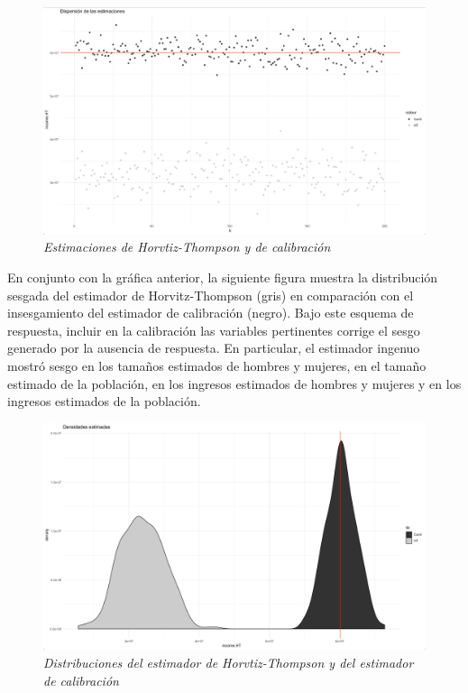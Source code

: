 \documentclass[
  10pt,
  spanish,
]{book}
\begin{document}
\begin{figure}
\centering
\includegraphics{Pics/c9.png}
\caption{\emph{Estimaciones de Horvtiz-Thompson y de calibración}}
\end{figure}

En conjunto con la gráfica anterior, la siguiente figura muestra la distribución sesgada del estimador de Horvitz-Thompson (gris) en comparación con el insesgamiento del estimador de calibración (negro). Bajo este esquema de respuesta, incluir en la calibración las variables pertinentes corrige el sesgo generado por la ausencia de respuesta. En particular, el estimador ingenuo mostró sesgo en los tamaños estimados de hombres y mujeres, en el tamaño estimado de la población, en los ingresos estimados de hombres y mujeres y en los ingresos estimados de la población.

\begin{figure}
\centering
\includegraphics{Pics/c10.png}
\caption{\emph{Distribuciones del estimador de Horvtiz-Thompson y del estimador de calibración}}
\end{figure}
\end{document}

